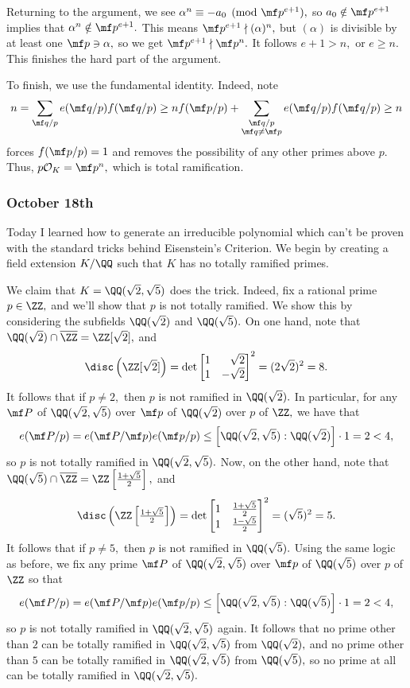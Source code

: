 Returning to the argument, we see $\alpha^n\equiv-a_0\pmod{\mf p^{e+1}},$ so $a_0\notin\mf p^{e+1}$ implies that $\alpha^n\notin\mf p^{e+1}.$ This means $\mf p^{e+1}\nmid(\alpha)^n,$ but $(\alpha)$ is divisible by at least one $\mf p\ni\alpha,$ so we get $\mf p^{e+1}\nmid\mf p^n.$ It follows $e+1>n,$ or $e\ge n.$ This finishes the hard part of the argument.

To finish, we use the fundamental identity. Indeed, note
\[n=\sum_{\mf q/p}e(\mf q/p)f(\mf q/p)\ge nf(\mf p/p)+\sum_{\substack{\mf q/p\\\mf q\ne \mf p}}e(\mf q/p)f(\mf q/p)\ge n\]
forces $f(\mf p/p)=1$ and removes the possibility of any other primes above $p.$ Thus, $p\mathcal O_K=\mf p^n,$ which is total ramification.

\subsubsection{October 18th}
Today I learned how to generate an irreducible polynomial which can't be proven with the standard tricks behind Eisenstein's Criterion. We begin by creating a field extension $K/\QQ$ such that $K$ has no totally ramified primes.

We claim that $K=\QQ(\sqrt2,\sqrt5)$ does the trick. Indeed, fix a rational prime $p\in\ZZ,$ and we'll show that $p$ is not totally ramified. We show this by considering the subfields $\QQ(\sqrt2)$ and $\QQ(\sqrt5).$ On one hand, note that $\QQ(\sqrt2)\cap\overline\ZZ=\ZZ[\sqrt2],$ and
\[\disc\left(\ZZ[\sqrt2]\right)=\det\begin{bmatrix}
    1 & \phantom-\sqrt2 \\
    1 & -\sqrt2 \\
\end{bmatrix}^2=(2\sqrt2)^2=8.\]
It follows that if $p\ne2,$ then $p$ is not ramified in $\QQ(\sqrt2).$ In particular, for any $\mf P$ of $\QQ(\sqrt2,\sqrt5)$ over $\mf p$ of $\QQ(\sqrt2)$ over $p$ of $\ZZ,$ we have that
\[e(\mf P/p)=e(\mf P/\mf p)e(\mf p/p)\le\left[\QQ(\sqrt2,\sqrt5):\QQ(\sqrt2)\right]\cdot1=2<4,\]
so $p$ is not totally ramified in $\QQ(\sqrt2,\sqrt5).$ Now, on the other hand, note that $\QQ(\sqrt5)\cap\overline\ZZ=\ZZ\left[\frac{1+\sqrt5}2\right],$ and
\[\disc\left(\ZZ\left[\textstyle\frac{1+\sqrt5}2\right]\right)=\det\begin{bmatrix}
    1 & \frac{1+\sqrt5}2 \\
    1 & \frac{1-\sqrt5}2 \\
\end{bmatrix}^2=(\sqrt5)^2=5.\]
It follows that if $p\ne5,$ then $p$ is not ramified in $\QQ(\sqrt5).$ Using the same logic as before, we fix any prime $\mf P$ of $\QQ(\sqrt2,\sqrt5)$ over $\mf p$ of $\QQ(\sqrt5)$ over $p$ of $\ZZ$ so that
\[e(\mf P/p)=e(\mf P/\mf p)e(\mf p/p)\le\left[\QQ(\sqrt2,\sqrt5):\QQ(\sqrt5)\right]\cdot1=2<4,\]
so $p$ is not totally ramified in $\QQ(\sqrt2,\sqrt5)$ again. It follows that no prime other than $2$ can be totally ramified in $\QQ(\sqrt2,\sqrt5)$ from $\QQ(\sqrt2),$ and no prime other than $5$ can be totally ramified in $\QQ(\sqrt2,\sqrt5)$ from $\QQ(\sqrt5),$ so no prime at all can be totally ramified in $\QQ(\sqrt2,\sqrt5).$

